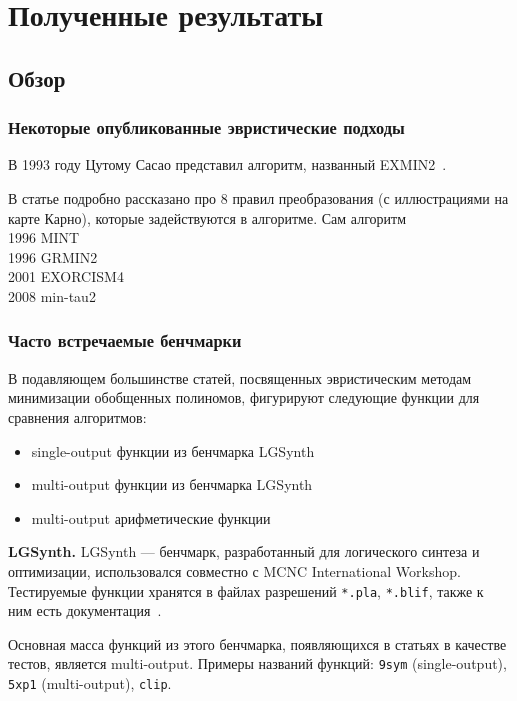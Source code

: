 \documentclass[a4paper,12pt,titlepage,finall]{article}
\begin{document}
\section{Полученные результаты}


\subsection*{Обзор}

\subsubsection*{Некоторые опубликованные эвристические подходы}

В 1993 году Цутому Сасао представил алгоритм, названный {\sc EXMIN2}~\cite{exmin2}.

В статье подробно рассказано про 8 правил преобразования (с иллюстрациями на карте Карно), которые задействуются в алгоритме. Сам алгоритм
~\\
1996 MINT~\cite{mint}\\
1996 GRMIN2~\cite{grmin2}\\
2001 EXORCISM4~\cite{exorcism4}\\
2008 min-tau2~\cite{min-tau2}

\subsubsection*{Часто встречаемые бенчмарки}

В подавляющем большинстве статей, посвященных эвристическим методам минимизации обобщенных полиномов, фигурируют следующие функции для сравнения алгоритмов:
\begin{itemize}
    \item single-output функции из бенчмарка LGSynth
    \item multi-output функции из бенчмарка LGSynth
    \item multi-output арифметические функции
\end{itemize}

{\bf LGSynth.}
LGSynth --- бенчмарк, разработанный для логического синтеза и оптимизации, использовался совместно с MCNC International Workshop. Тестируемые функции хранятся в файлах разрешений \texttt{*.pla}, \texttt{*.blif}, также к ним есть документация~\cite{benchmark}.

Основная масса функций из этого бенчмарка, появляющихся в статьях в качестве тестов, является multi-output. Примеры названий функций: \texttt{9sym} (single-output), \texttt{5xp1} (multi-output), \texttt{clip}.
\end{document}
